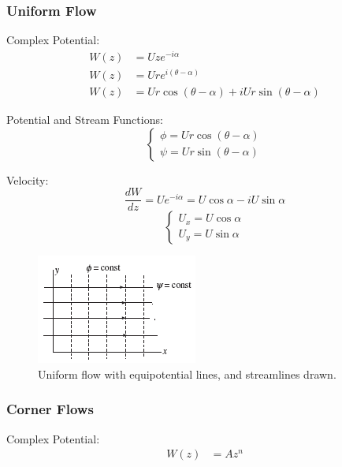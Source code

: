 \subsubsection{Uniform Flow}
Complex Potential:
\begin{align}
    W(z) &= U z e^{-i\alpha} \\
    W(z) &= U r e^{i(\theta - \alpha)} \\
    W(z) &= U r \cos(\theta - \alpha) + i U r \sin(\theta - \alpha) 
\end{align}

Potential and Stream Functions:
\begin{equation}
    \begin{cases}
        \phi = U r \cos(\theta - \alpha)\\
        \psi = U r \sin(\theta - \alpha)
    \end{cases}
\end{equation}

Velocity:
\begin{equation}
    \frac{dW}{dz} =  U e^{-i\alpha}  = U \cos\alpha - iU\sin\alpha
\end{equation}
\begin{equation}
    \begin{cases}
        U_x = U \cos\alpha\\
        U_y = U \sin\alpha
    \end{cases}
\end{equation}

\begin{figure}[!h]
    \centering
    \includegraphics[scale=1.0]{./img/uniform_flow.png}
    \caption{Uniform flow with equipotential lines, and streamlines drawn.}
    \label{joukowski_cylinder}
\end{figure}

\subsubsection{Corner Flows}
Complex Potential:
\begin{align}
    W(z) &= A z^n
\end{align}




